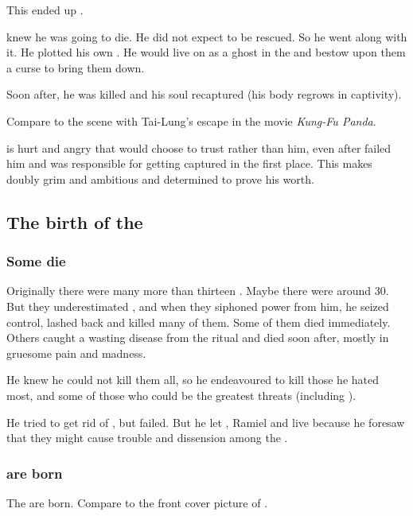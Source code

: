 This ended up . 


\Nexagglachel{} knew he was going to die. 
He did not expect to be rescued. 
So he went along with it. 
He plotted his own \XanatosGambit. 
He would live on as a ghost in the \satharioth{} and bestow upon them a curse to bring them down. 

Soon after, he was killed and his soul recaptured (his body regrows in captivity). 

Compare to the scene with Tai-Lung's escape in the movie \emph{Kung-Fu Panda}. 

\Secherdamon{} is hurt and angry that \Nexagglachel{} would choose to trust \Ishnaruchaefir{} rather than him, even after \Ishnaruchaefir{} failed him and was responsible for getting \Nexagglachel{} captured in the first place. 
This makes \Secherdamon{} doubly grim and ambitious and determined to prove his worth. 









\subsection{The birth of the \Satharioth}
\subsubsection{Some \satharioth{} die}
Originally there were many more than thirteen \satharioth. 
Maybe there were around 30. 
But they underestimated \Nexagglachel, and when they siphoned power from him, he seized control, lashed back and killed many of them. 
Some of them died immediately. 
Others caught a wasting disease from the ritual and died soon after, mostly in gruesome pain and madness. 

He knew he could not kill them all, so he endeavoured to kill those he hated most, and some of those who could be the greatest threats (including ). 

He tried to get rid of \Azraid, but failed. 
But he let \Zachirah, Ramiel and \Sithiyacaan{} live because he foresaw that they might cause trouble and dissension among the \resphain. 





\subsubsection{\Satharioth{} are born}
The \satharioth{} are born. 
Compare to the front cover picture of . 

